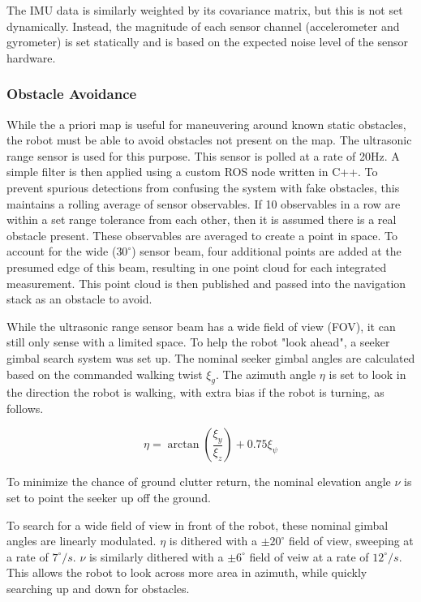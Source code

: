 The IMU data is similarly weighted by its covariance matrix, but this is not set dynamically. Instead, the magnitude of each sensor channel (accelerometer and gyrometer) is set statically and is based on the expected noise level of the sensor hardware.

\subsubsection{ Obstacle Avoidance }

While the a priori map is useful for maneuvering around known static obstacles, the robot must be able to avoid obstacles not present on the map. The ultrasonic range sensor is used for this purpose. This sensor is polled at a rate of 20Hz. A simple filter is then applied using a custom ROS node written in C++. To prevent spurious detections from confusing the system with fake obstacles, this maintains a rolling average of sensor observables. If 10 observables in a row are within a set range tolerance from each other, then it is assumed there is a real obstacle present. These observables are averaged to create a point in space. To account for the wide ($30^{\circ}$) sensor beam, four additional points are added at the presumed edge of this beam, resulting in one point cloud for each integrated measurement. This point cloud is then published and passed into the navigation stack as an obstacle to avoid.

While the ultrasonic range sensor beam has a wide field of view (FOV), it can still only sense with a limited space. To help the robot "look ahead", a seeker gimbal search system was set up. The nominal seeker gimbal angles are calculated based on the commanded walking twist $\xi_g$. The azimuth angle $\eta$ is set to look in the direction the robot is walking, with extra bias if the robot is turning, as follows.

\begin{equation}
    \eta = \arctan( \frac{ \xi_y }{\xi_z} ) + 0.75 \xi_{\psi}
\end{equation}

To minimize the chance of ground clutter return, the nominal elevation angle $\nu$ is set to point the seeker up off the ground. 

To search for a wide field of view in front of the robot, these nominal gimbal angles are linearly modulated. $\eta$ is dithered with a $\pm 20^{\circ}$ field of view, sweeping at a rate of $7^{\circ}/s$. $\nu$ is similarly dithered with a $\pm 6^{\circ}$ field of veiw at a rate of $12^{\circ}/s$. This allows the robot to look across more area in azimuth, while quickly searching up and down for obstacles. 

